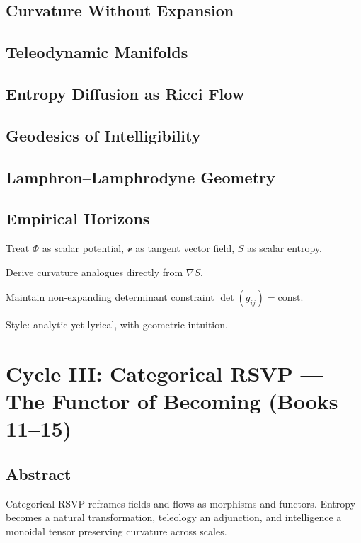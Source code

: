 \documentclass[12pt,oneside]{book}
\newcommand{\PhiField}{\ensuremath{\Phi}}
\newcommand{\vField}{\ensuremath{\boldsymbol{\mathcal{v}}}}
\newcommand{\SEntropy}{\ensuremath{S}}
\newcommand{\grad}{\nabla}
\begin{document}
\chapter{Curvature Without Expansion}
\chapter{Teleodynamic Manifolds}
\chapter{Entropy Diffusion as Ricci Flow}
\chapter{Geodesics of Intelligibility}
\chapter{Lamphron--Lamphrodyne Geometry}
\chapter{Empirical Horizons}

\begin{botinstructions}
  \item Treat $\PhiField$ as scalar potential, $\vField$ as tangent vector field, $\SEntropy$ as scalar entropy.
  \item Derive curvature analogues directly from $\grad \SEntropy$.
  \item Maintain non-expanding determinant constraint $\det(g_{ij})=\text{const}$.
  \item Style: analytic yet lyrical, with geometric intuition.
\end{botinstructions}

\part{Cycle III: Categorical RSVP — The Functor of Becoming (Books 11--15)}

\chapter*{Abstract}
Categorical RSVP reframes fields and flows as morphisms and functors.
Entropy becomes a natural transformation, teleology an adjunction,
and intelligence a monoidal tensor preserving curvature across scales.
\end{document}
